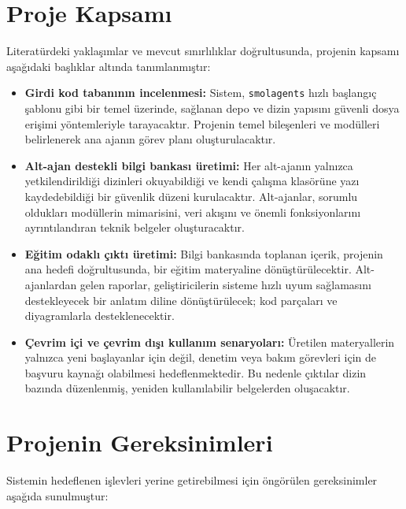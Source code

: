 \section{Proje Kapsamı}
\label{sec:kapsam}

Literatürdeki yaklaşımlar ve mevcut sınırlılıklar doğrultusunda, projenin kapsamı aşağıdaki başlıklar altında tanımlanmıştır:

\begin{itemize}
    \item \textbf{Girdi kod tabanının incelenmesi:} Sistem, \texttt{smolagents} hızlı başlangıç şablonu gibi bir temel üzerinde, sağlanan depo ve dizin yapısını güvenli dosya erişimi yöntemleriyle tarayacaktır. Projenin temel bileşenleri ve modülleri belirlenerek ana ajanın görev planı oluşturulacaktır.
    \item \textbf{Alt-ajan destekli bilgi bankası üretimi:} Her alt-ajanın yalnızca yetkilendirildiği dizinleri okuyabildiği ve kendi çalışma klasörüne yazı kaydedebildiği bir güvenlik düzeni kurulacaktır. Alt-ajanlar, sorumlu oldukları modüllerin mimarisini, veri akışını ve önemli fonksiyonlarını ayrıntılandıran teknik belgeler oluşturacaktır.
    \item \textbf{Eğitim odaklı çıktı üretimi:} Bilgi bankasında toplanan içerik, projenin ana hedefi doğrultusunda, bir eğitim materyaline dönüştürülecektir. Alt-ajanlardan gelen raporlar, geliştiricilerin sisteme hızlı uyum sağlamasını destekleyecek bir anlatım diline dönüştürülecek; kod parçaları ve diyagramlarla desteklenecektir.
    \item \textbf{Çevrim içi ve çevrim dışı kullanım senaryoları:} Üretilen materyallerin yalnızca yeni başlayanlar için değil, denetim veya bakım görevleri için de başvuru kaynağı olabilmesi hedeflenmektedir. Bu nedenle çıktılar dizin bazında düzenlenmiş, yeniden kullanılabilir belgelerden oluşacaktır.
\end{itemize}

\section{Projenin Gereksinimleri}
\label{sec:gereksinimler}

Sistemin hedeflenen işlevleri yerine getirebilmesi için öngörülen gereksinimler aşağıda sunulmuştur:

